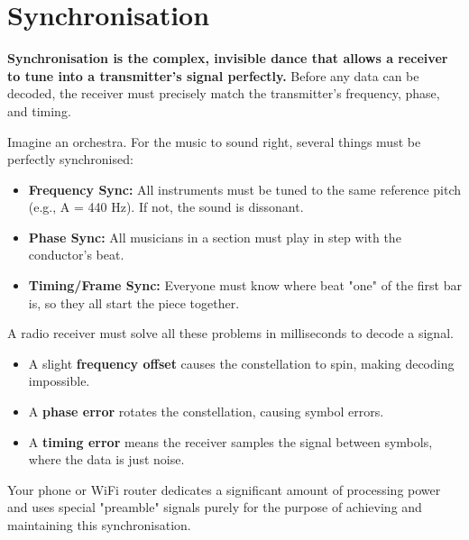 
\chapter{Synchronisation}
\label{ch:synchronisation}

\begin{nontechnical}
    \textbf{Synchronisation is the complex, invisible dance that allows a receiver to tune into a transmitter's signal perfectly.} Before any data can be decoded, the receiver must precisely match the transmitter's frequency, phase, and timing.

    Imagine an orchestra. For the music to sound right, several things must be perfectly synchronised:
    \begin{itemize}
        \item \textbf{Frequency Sync:} All instruments must be tuned to the same reference pitch (e.g., A = 440 Hz). If not, the sound is dissonant.
        \item \textbf{Phase Sync:} All musicians in a section must play in step with the conductor's beat.
        \item \textbf{Timing/Frame Sync:} Everyone must know where beat "one" of the first bar is, so they all start the piece together.
    \end{itemize}
    A radio receiver must solve all these problems in milliseconds to decode a signal.

    \begin{itemize}
        \item A slight \textbf{frequency offset} causes the constellation to spin, making decoding impossible.
        \item A \textbf{phase error} rotates the constellation, causing symbol errors.
        \item A \textbf{timing error} means the receiver samples the signal between symbols, where the data is just noise.
    \end{itemize}
    Your phone or WiFi router dedicates a significant amount of processing power and uses special "preamble" signals purely for the purpose of achieving and maintaining this synchronisation.
\end{nontechnical}


